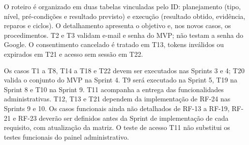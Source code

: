 O roteiro é organizado em duas tabelas vinculadas pelo ID: planejamento (tipo, nível, pré-condições e resultado previsto) e execução (resultado obtido, evidência, reparos e ciclos). O detalhamento apresenta o objetivo e, nos novos casos, os procedimentos. T2 e T3 validam e-mail e senha do MVP; não testam a senha do Google. O consentimento cancelado é tratado em T13, tokens inválidos ou expirados em T21 e acesso sem sessão em T22.

Os casos T1 a T8, T14 a T18 e T22 devem ser executados nas Sprints 3 e 4; T20 valida o conjunto do MVP na Sprint 4. T9 será executado na Sprint 5, T19 na Sprint 8 e T10 na Sprint 9. T11 acompanha a entrega das funcionalidades administrativas. T12, T13 e T21 dependem da implementação de RF-24 nas Sprints 9 e 10. Os casos funcionais ainda não detalhados de RF-13 a RF-19, RF-21 e RF-23 deverão ser definidos antes da Sprint de implementação de cada requisito, com atualização da matriz. O teste de acesso T11 não substitui os testes funcionais do painel administrativo.

